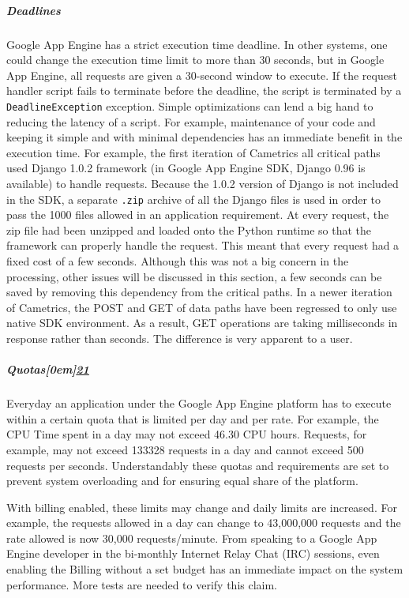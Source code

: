 \documentclass[10pt,a4paper,english]{article}
\begin{document}
\hypertarget{deadlines}{}
\subparagraph*{Deadlines}
\label{deadlines}

Google App Engine has a strict execution time deadline. In other systems, one could change the execution time limit to more than 30 seconds, but in Google App Engine, all requests are given a 30-second window to execute. If the request handler script fails to terminate before the deadline, the script is terminated by a \texttt{DeadlineException} exception. Simple optimizations can lend a big hand to reducing the latency of a script. For example, maintenance of your code and keeping it simple and with minimal dependencies has an immediate benefit in the execution time. For example, the first iteration of Cametrics all critical paths used Django 1.0.2 framework (in Google App Engine SDK, Django 0.96 is available) to handle requests. Because the 1.0.2 version of Django is not included in the SDK, a separate \texttt{.zip} archive of all the Django files is used in order to pass the 1000 files allowed in an application requirement. At every request, the zip file had been unzipped and loaded onto the Python runtime so that the framework can properly handle the request. This meant that every request had a fixed cost of a few seconds. Although this was not a big concern in the processing, other issues will be discussed in this section, a few seconds can be saved by removing this dependency from the critical paths. In a newer iteration of Cametrics, the POST and GET of data paths have been regressed to only use native SDK environment. As a result, GET operations are taking milliseconds in response rather than seconds. The difference is very apparent to a user.



\hypertarget{quotas}{}
\subparagraph*{Quotas\raisebox{.5em}[0em]{\scriptsize\hyperlink{id45}{21}}}
\label{quotas}

Everyday an application under the Google App Engine platform has to execute within a certain quota that is limited per day and per rate. For example, the CPU Time spent in a day may not exceed 46.30 CPU hours. Requests, for example, may not exceed 133328 requests in a day and cannot exceed 500 requests per seconds. Understandably these quotas and requirements are set to prevent system overloading and for ensuring equal share of the platform.

With billing enabled, these limits may change and daily limits are increased. For example, the requests allowed in a day can change to 43,000,000 requests and the rate allowed is now 30,000 requests/minute. From speaking to a Google App Engine developer in the bi-monthly Internet Relay Chat (IRC) sessions, even enabling the Billing without a set budget has an immediate impact on the system performance. More tests are needed to verify this claim.
\end{document}
